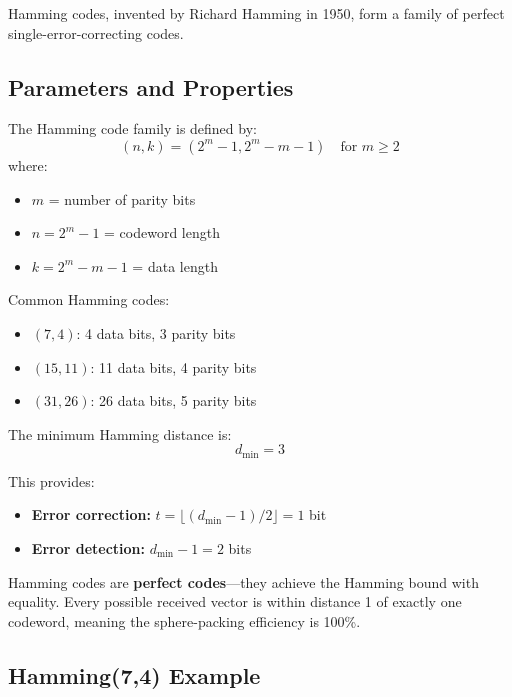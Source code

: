 Hamming codes, invented by Richard Hamming in 1950, form a family of perfect single-error-correcting codes.

\subsection{Parameters and Properties}

The Hamming code family is defined by:
\begin{equation}
(n, k) = (2^m - 1, 2^m - m - 1) \quad \text{for } m \geq 2
\end{equation}
where:
\begin{itemize}
\item $m$ = number of parity bits
\item $n = 2^m - 1$ = codeword length
\item $k = 2^m - m - 1$ = data length
\end{itemize}

Common Hamming codes:
\begin{itemize}
\item $(7, 4)$: 4 data bits, 3 parity bits
\item $(15, 11)$: 11 data bits, 4 parity bits
\item $(31, 26)$: 26 data bits, 5 parity bits
\end{itemize}

The minimum Hamming distance is:
\begin{equation}
d_{\min} = 3
\end{equation}

This provides:
\begin{itemize}
\item \textbf{Error correction:} $t = \lfloor (d_{\min}-1)/2 \rfloor = 1$ bit
\item \textbf{Error detection:} $d_{\min} - 1 = 2$ bits
\end{itemize}

\begin{keyconcept}
Hamming codes are \textbf{perfect codes}---they achieve the Hamming bound with equality. Every possible received vector is within distance 1 of exactly one codeword, meaning the sphere-packing efficiency is 100\%.
\end{keyconcept}

\subsection{Hamming(7,4) Example}\label{hamming74-example}

